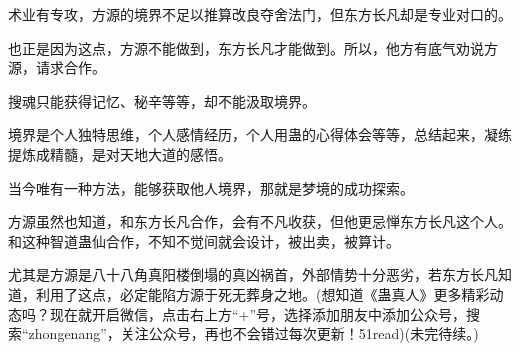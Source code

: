\begin{this_body}
术业有专攻，方源的境界不足以推算改良夺舍法门，但东方长凡却是专业对口的。

也正是因为这点，方源不能做到，东方长凡才能做到。所以，他方有底气劝说方源，请求合作。

搜魂只能获得记忆、秘辛等等，却不能汲取境界。

境界是个人独特思维，个人感情经历，个人用蛊的心得体会等等，总结起来，凝练提炼成精髓，是对天地大道的感悟。

当今唯有一种方法，能够获取他人境界，那就是梦境的成功探索。

方源虽然也知道，和东方长凡合作，会有不凡收获，但他更忌惮东方长凡这个人。和这种智道蛊仙合作，不知不觉间就会设计，被出卖，被算计。

尤其是方源是八十八角真阳楼倒塌的真凶祸首，外部情势十分恶劣，若东方长凡知道，利用了这点，必定能陷方源于死无葬身之地。(想知道《蛊真人》更多精彩动态吗？现在就开启微信，点击右上方“+”号，选择添加朋友中添加公众号，搜索“zhongenang”，关注公众号，再也不会错过每次更新！51read)(未完待续。)

\end{this_body}

